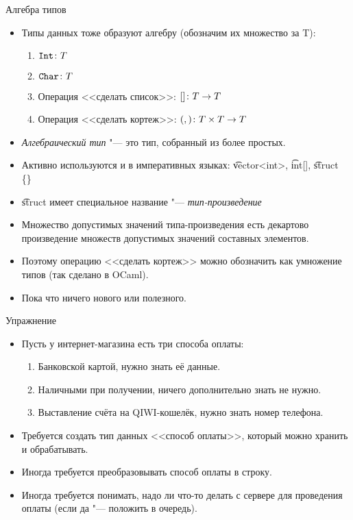 \begin{frame}{Алгебра типов}
	\begin{itemize}
		\item Типы данных тоже образуют алгебру (обозначим их множество за T):
			\begin{enumerate}
				\item $\t{Int} \colon T$
				\item $\t{Char} \colon T$
				\item Операция <<сделать список>>: $\t{[]} \colon T \to T$
				\item Операция <<сделать кортеж>>: $\t{(,)} \colon T \times T \to T$
			\end{enumerate}
		\item \textit{Алгебраический тип} "--- это тип, собранный из более простых.
		\item Активно используются и в императивных языках: \t{vector<int>}, \t{int[]}, \t{struct \{\}}
		\item \t{struct} имеет специальное название "--- \textit{тип-произведение}
		\item Множество допустимых значений типа-произведения есть декартово произведение множеств допустимых значений составных элементов.
		\item Поэтому операцию <<сделать кортеж>> можно обозначить как умножение типов (так сделано в OCaml).
		\item Пока что ничего нового или полезного.
	\end{itemize}
\end{frame}

\begin{frame}{Упражнение}
	\begin{itemize}
		\item Пусть у интернет-магазина есть три способа оплаты:
			\begin{enumerate}
				\item Банковской картой, нужно знать её данные.
				\item Наличными при получении, ничего дополнительно знать не нужно.
				\item Выставление счёта на QIWI-кошелёк, нужно знать номер телефона.
			\end{enumerate}
		\item Требуется создать тип данных <<способ оплаты>>, который можно хранить и обрабатывать.
		\item Иногда требуется преобразовывать способ оплаты в строку.
		\item Иногда требуется понимать, надо ли что-то делать с сервере для проведения оплаты (если да "--- положить в очередь).
	\end{itemize}
\end{frame}

